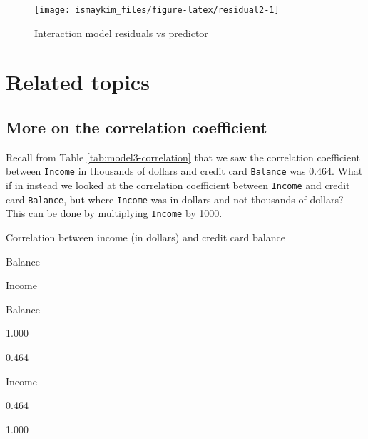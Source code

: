 \documentclass[12pt,]{krantz}
\makeatletter
\newenvironment{Shaded}{\begin{snugshade}}{\end{snugshade}}
\newcommand{\KeywordTok}[1]{\textcolor[rgb]{0.27,0.27,0.27}{\textbf{#1}}}
\newcommand{\DataTypeTok}[1]{\textcolor[rgb]{0.27,0.27,0.27}{#1}}
\newcommand{\DecValTok}[1]{\textcolor[rgb]{0.06,0.06,0.06}{#1}}
\newcommand{\StringTok}[1]{\textcolor[rgb]{0.5,0.5,0.5}{#1}}
\newcommand{\OperatorTok}[1]{\textcolor[rgb]{0.43,0.43,0.43}{\textbf{#1}}}
\newcommand{\NormalTok}[1]{#1}
\newenvironment{kframe}{%
\medskip{}
\setlength{\fboxsep}{.8em}
 \def\at@end@of@kframe{}%
 \ifinner\ifhmode%
  \def\at@end@of@kframe{\end{minipage}}%
  \begin{minipage}{\columnwidth}%
 \fi\fi%
 \def\FrameCommand##1{\hskip\@totalleftmargin \hskip-\fboxsep
 \colorbox{shadecolor}{##1}\hskip-\fboxsep
     \hskip-\linewidth \hskip-\@totalleftmargin \hskip\columnwidth}%
 \MakeFramed {\advance\hsize-\width
   \@totalleftmargin\z@ \linewidth\hsize
   \@setminipage}}%
 {\par\unskip\endMakeFramed%
 \at@end@of@kframe}
\renewenvironment{Shaded}{\begin{kframe}}{\end{kframe}}
\makeatother
\begin{document}
\begin{figure}

{\centering \texttt{[image: ismaykim\_files/figure-latex/residual2-1]} 

}

\caption{Interaction model residuals vs predictor}\label{fig:residual2}
\end{figure}

\section{Related topics}\label{related-topics-1}

\subsection{More on the correlation
coefficient}\label{correlationcoefficient2}

Recall from Table \ref{tab:model3-correlation} that we saw the
correlation coefficient between \texttt{Income} in thousands of dollars
and credit card \texttt{Balance} was 0.464. What if in instead we looked
at the correlation coefficient between \texttt{Income} and credit card
\texttt{Balance}, but where \texttt{Income} was in dollars and not
thousands of dollars? This can be done by multiplying \texttt{Income} by
1000.

\begin{Shaded}
\end{Shaded}

\label{tab:cor-credit-2}Correlation between income (in dollars) and credit
card balance

Balance

Income

Balance

1.000

0.464

Income

0.464

1.000
\end{document}
